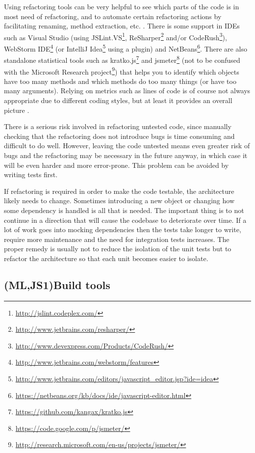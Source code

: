 \documentclass[11pt]{article}
\begin{document}
Using refactoring tools can be very helpful to see which parts of the code is in most need of refactoring, and to automate certain refactoring actions by facilitating renaming, method extraction, etc. \cite[ch.~5]{Legacy}. There is some support in IDEs such as Visual Studio (using
JSLint.VS\footnote{\url{http://jslint.codeplex.com/}},
ReSharper\footnote{\url{http://www.jetbrains.com/resharper/}} and/or
CodeRush\footnote{\url{http://www.devexpress.com/Products/CodeRush/}}),
WebStorm IDE\footnote{\url{http://www.jetbrains.com/webstorm/features}} (or
IntelliJ Idea\footnote{\url{http://www.jetbrains.com/editors/javascript_editor.jsp?ide=idea}} using a plugin) and
NetBeans\footnote{\url{https://netbeans.org/kb/docs/ide/javascript-editor.html}}. There are also standalone statistical tools such as
kratko.js\footnote{\url{https://github.com/kangax/kratko.js}} and
jsmeter\footnote{\url{https://code.google.com/p/jsmeter/}} (not to be confused with the
Microsoft Research project\footnote{\url{http://research.microsoft.com/en-us/projects/jsmeter/}}) that helps you to identify which objects have too many methods and which methods do too many things (or have too many arguments). Relying on metrics such as lines of code is of course not always appropriate due to different coding styles, but at least it provides an overall picture \cite{Kratko}.

There is a serious risk involved in refactoring untested code\cite[p.~17]{Refactoring}, since manually checking that the refactoring does not introduce bugs is time consuming and difficult to do well. However, leaving the code untested means even greater risk of bugs and the refactoring may be necessary in the future anyway, in which case it will be even harder and more error-prone. This problem can be avoided by writing tests first.

If refactoring is required in order to make the code testable, the architecture likely needs to change. Sometimes introducing a new object or changing how some dependency is handled is all that is needed. The important thing is to not continue in a direction that will cause the codebase to deteriorate over time. \cite[question~34]{Stenmark} If a lot of work goes into mocking dependencies then the tests take longer to write, require more maintenance and the need for integration tests increases. The proper remedy is usually not to reduce the isolation of the unit tests but to refactor the architecture so that each unit becomes easier to isolate. \cite[question~42]{Stenmark}

\subsection{(ML,JS1)Build tools}
\label{subsec:build}
\end{document}
